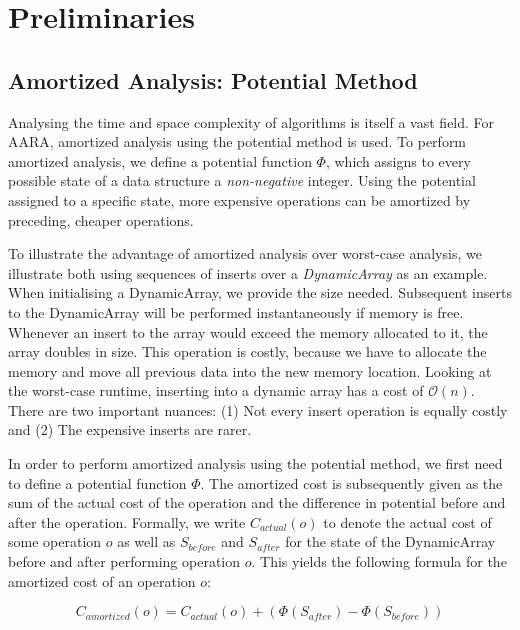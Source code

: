\chapter{Preliminaries} \label{chap:linear}

\section{Amortized Analysis: Potential Method}
Analysing the time and space complexity of algorithms is itself a vast field. For AARA, amortized analysis using the potential method is used. To perform amortized analysis, we define a potential function \(\Phi\), which assigns to every possible state of a data structure a \emph{non-negative} integer. Using the potential assigned to a specific state, more expensive operations can be amortized by preceding, cheaper operations.

To illustrate the advantage of amortized analysis over worst-case analysis, we illustrate both using sequences of inserts over a \emph{DynamicArray} as an example. When initialising a DynamicArray, we provide the size needed. Subsequent inserts to the DynamicArray will be performed instantaneously if memory is free. Whenever an insert to the array would exceed the memory allocated to it, the array doubles in size.
This operation is costly, because we have to allocate the memory and move all previous data into the new memory location. Looking at the worst-case runtime, inserting into a dynamic array has a cost of \(\mathcal{O}(n)\). There are two important nuances: (1) Not every insert operation is equally costly and (2) The expensive inserts are rarer.

In order to perform amortized analysis using the potential method, we first need to define a potential function \(\Phi\). The amortized cost is subsequently given as the sum of the actual cost of the operation and the difference in potential before and after the operation. Formally, we write \(C_{actual}(o)\) to denote the actual cost of some operation \(o\) as well as \(S_{before}\) and \(S_{after}\) for the state of the DynamicArray before and after performing operation \(o\). This yields the following formula for the amortized cost of an operation \(o\):

\[C_{amortized}(o) = C_{actual}(o) + (\Phi(S_{after}) - \Phi(S_{before}))\]
\label{eq:amortized-cost}


